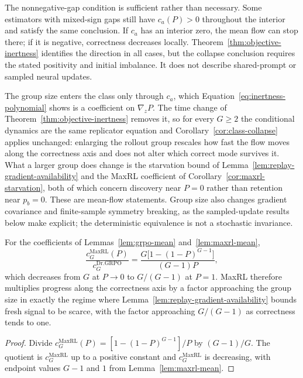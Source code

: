 The nonnegative-gap condition is sufficient rather than necessary. Some
estimators with mixed-sign gaps still have $c_a(P)>0$ throughout the interior
and satisfy the same conclusion. If $c_a$ has an interior zero, the mean flow
can stop there; if it is negative, correctness decreases locally.
Theorem~\ref{thm:objective-inertness} identifies the direction in all cases,
but the collapse conclusion requires the stated positivity and initial
imbalance. It does not describe shared-prompt or sampled neural updates.

\begin{remark}
\label{rem:group-size-inert}
The group size enters the class only through $c_a$, which
Equation~\eqref{eq:inertness-polynomial} shows is a coefficient on
$\nabla_zP$. The time change of Theorem~\ref{thm:objective-inertness} removes
it, so for every $G\ge2$ the conditional dynamics are the same replicator
equation and Corollary~\ref{cor:class-collapse} applies unchanged: enlarging
the rollout group rescales how fast the flow moves along the correctness axis
and does not alter which correct mode survives it. What a larger group does
change is the starvation bound of
Lemma~\ref{lem:replay-gradient-availability} and the MaxRL coefficient of
Corollary~\ref{cor:maxrl-starvation}, both of which concern discovery near
$P=0$ rather than retention near $p_b=0$. These are mean-flow statements. Group size also changes gradient covariance
and finite-sample symmetry breaking, as the sampled-update results below
make explicit; the deterministic equivalence is not a stochastic invariance.
\end{remark}

\begin{corollary}
\enforcehalffinalproseline
\label{cor:maxrl-starvation}
For the coefficients of Lemmas~\ref{lem:grpo-mean} and~\ref{lem:maxrl-mean},
\[
 \frac{c_G^{\mathrm{MaxRL}}(P)}{c_G^{\mathrm{Dr.GRPO}}}
 =\frac{G\big[1-(1-P)^{G-1}\big]}{(G-1)P},
\]
which decreases from $G$ at $P\to0$ to $G/(G-1)$ at $P=1$. MaxRL therefore
multiplies progress along the correctness axis by a factor approaching the
group size in exactly the regime where
Lemma~\ref{lem:replay-gradient-availability} bounds fresh signal to be scarce,
with the factor approaching $G/(G-1)$ as correctness tends to one.
\end{corollary}

\begin{proof}
\enforcehalffinalproseline
Divide $c_G^{\mathrm{MaxRL}}(P)=[1-(1-P)^{G-1}]/P$ by $(G-1)/G$. The quotient
is $c_G^{\mathrm{MaxRL}}$ up to a positive constant and
$c_G^{\mathrm{MaxRL}}$ is decreasing, with endpoint values $G-1$ and $1$ from
Lemma~\ref{lem:maxrl-mean}.
\end{proof}

